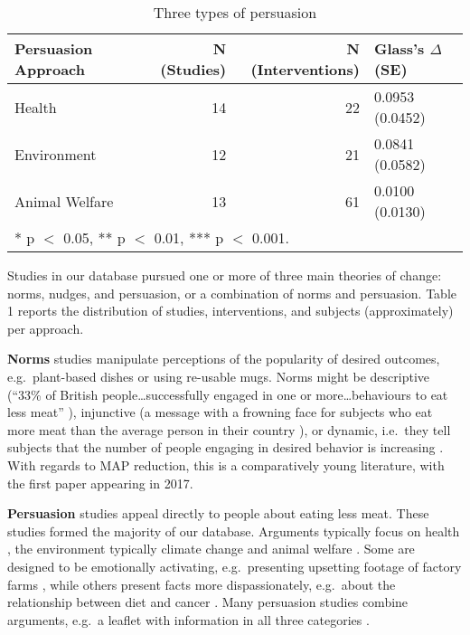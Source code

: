 \documentclass[sn-nature,pdflatex]{sn-jnl}
\begin{document}
\begin{table}[!h]
\centering
\caption{\label{tab:tab:table_two}Three types of persuasion}
\centering
\begin{tabular}[t]{lrrl}
\toprule
Persuasion Approach & N (Studies) & N (Interventions) & Glass's $\Delta$ (SE)\\
\midrule
Health & 14 & 22 & 0.0953 (0.0452)\\
Environment & 12 & 21 & 0.0841 (0.0582)\\
Animal Welfare & 13 & 61 & 0.0100 (0.0130)\\
\bottomrule
\multicolumn{4}{l}{\rule{0pt}{1em}* p $<$ 0.05, ** p $<$ 0.01, *** p $<$ 0.001.}\\
\end{tabular}
\end{table}

Studies in our database pursued one or more of three main theories of
change: norms, nudges, and persuasion, or a combination of norms and
persuasion. Table 1 reports the distribution of studies, interventions,
and subjects (approximately) per approach.

\textbf{Norms} studies manipulate perceptions of the popularity of
desired outcomes, e.g.~plant-based dishes \citep{sparkman2021} or using
re-usable mugs\citep{loschelder2019}. Norms might be descriptive (``33\%
of British people\ldots successfully engaged in one or
more\ldots behaviours to eat less meat'' \citep{aldoh2023}), injunctive
(a message with a frowning face for subjects who eat more meat than the
average person in their country \citep{alblas2023}), or dynamic,
i.e.~they tell subjects that the number of people engaging in desired
behavior is increasing
\citep{aldoh2023, coker2022, sparkman2017, sparkman2020, sparkman2021}.
With regards to MAP reduction, this is a comparatively young literature,
with the first paper appearing in 2017.

\textbf{Persuasion} studies appeal directly to people about eating less
meat. These studies formed the majority of our database. Arguments
typically focus on health \citep{lacroix2020}, the environment
\citep{carfora2023} \textemdash typically climate change \textemdash and
animal welfare \citep{haile2021}. Some are designed to be emotionally
activating, e.g.~presenting upsetting footage of factory farms
\citep{bertolaso2015}, while others present facts more dispassionately,
e.g.~about the relationship between diet and cancer \citep{hatami2018}.
Many persuasion studies combine arguments, e.g.~a leaflet with
information in all three categories \citep{hennessy2016}.
\end{document}
